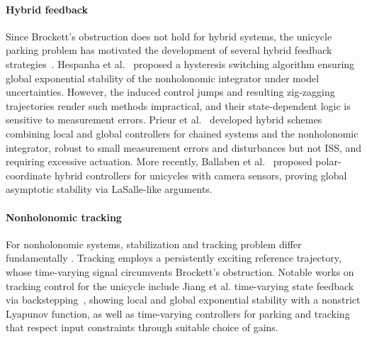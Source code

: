 \documentclass[journal,twoside,web]{ieeecolor}
\theoremstyle{definition}
\begin{document}
\paragraph{Hybrid feedback}
Since Brockett's obstruction does not hold for hybrid systems, the unicycle parking problem has motivated the development of several hybrid feedback strategies~\cite{pomet1992hybrid}. Hespanha et al.~\cite{hespanha1999_hybrid_stabilization,hespanha1999logic} proposed a hysteresis switching algorithm ensuring global exponential stability of the nonholonomic integrator under model uncertainties. However, the induced control jumps and resulting zig-zagging trajectories render such methods impractical, and their state-dependent logic is sensitive to measurement errors.
Prieur et al.~\cite{prieur2003robust,prieur2005robust} developed hybrid schemes combining local and global controllers for chained systems and the nonholonomic integrator, robust to small measurement errors and disturbances but not ISS, and requiring excessive actuation. More recently, Ballaben et al.~\cite{ballaben2025orchestrating} proposed polar-coordinate hybrid controllers for unicycles with camera sensors, proving global asymptotic stability via LaSalle-like arguments.

\paragraph{Nonholonomic tracking}
For nonholonomic systems, stabilization and tracking problem differ fundamentally  \cite{jiang2010controlling}. Tracking employs a persistently exciting reference trajectory, whose time-varying signal circumvents Brockett's obstruction.
Notable works on tracking control for the unicycle include Jiang et al. time-varying state feedback via backstepping~\cite{jiangdagger1997tracking,jiang1999recursive, jiang2001saturated}, showing local and global exponential stability with a nonstrict Lyapunov function, as well as time-varying controllers for parking and tracking that respect input constraints through suitable choice of gains.
\end{document}
